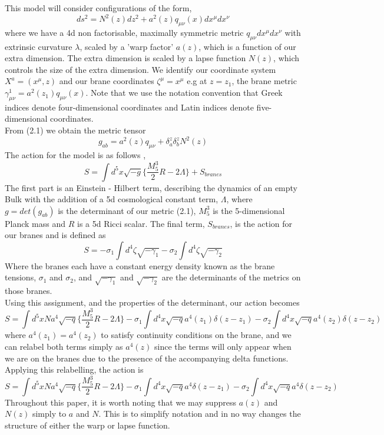 \documentclass[11pt]{report}
\numberwithin{equation}{chapter}
\begin{document}
This model will consider configurations of the form,
\begin{equation}
    ds^2= N^2(z)dz^{2} + a^{2}(z) q _{\mu\nu}(x) dx^{\mu} dx^{\nu}
\end{equation}
where we have a 4d non factorisable, maximally symmetric metric $q_{\mu\nu}dx^\mu dx^\nu$ with extrinsic curvature $\lambda$, scaled by a 'warp factor' $a(z)$, which is a function of our extra dimension. The extra dimension is scaled by a lapse function $N(z)$, which controls the size of the extra dimension. We identify our coordinate system $X^a = (x^\mu , z)$ and our brane coordinates $\zeta^\mu = x^\mu$ e.g at $z=z_1$, the brane metric $\gamma^{1}_{\mu\nu}=a^{2}(z_1) q _{\mu\nu}(x)$. Note that we use the notation convention that Greek indices denote four-dimensional coordinates and Latin indices denote five-dimensional coordinates.\\
From (2.1) we obtain the metric tensor
\begin{equation}
    g_{a b}=a^2(z) q_{\mu\nu}+\delta_a^z \delta_b^z N^2(z)
\end{equation}
The action for the model is as follows \cite{RS1},
\begin{equation}
    S= \int d^{5}x  \sqrt{-g} \bigg\{ \frac{M^{3}_{5}}{2} R -2\Lambda \bigg\}  +S_{branes}
\end{equation}
The first part is an Einstein - Hilbert term, describing the dynamics of an empty Bulk with the addition of a 5d cosmological constant term, $\Lambda$, where $g=det(g_{ab})$ is the determinant of our metric (2.1), $M^{3}_{5}$ is the 5-dimensional Planck mass and $R$ is a 5d Ricci scalar. The final term, $S_{branes}$, is the action for our branes and is defined as
\begin{equation}
    S= -\sigma_1\int d^{4}\zeta   \sqrt{-\gamma_1} - \sigma_2\int d^{4}\zeta   \sqrt{-\gamma_2}
\end{equation}
Where the branes each have a constant energy density known as the brane tensions, $\sigma_1$ and $\sigma_2$, and $\sqrt{-\gamma_1}$ and $\sqrt{-\gamma_2}$ are the determinants of the metrics on those branes.\\

Using this assignment, and the properties of the determinant, our action becomes
\begin{equation}
    S= \int d^{5}x Na^{4} \sqrt{-q} \bigg\{ \frac{M^{3}_{5}}{2} R -2\Lambda \bigg\} - \sigma_1\int d^4x\sqrt{-q}a^4(z_1)\delta(z-z_1) - \sigma_2\int d^4x\sqrt{-q}a^4(z_2)\delta(z-z_2)
\end{equation}
where $a^4(z_1) = a^4(z_2)$ to satisfy continuity conditions on the brane, and we can relabel both terms simply as $a^4(z)$ since the terms will only appear when we are on the branes due to the presence of the accompanying delta functions. Applying this relabelling, the action is
\begin{equation}
    S= \int d^{5}x Na^{4} \sqrt{-q} \bigg\{ \frac{M^{3}_{5}}{2} R -2\Lambda \bigg\} - \sigma_1\int d^4x\sqrt{-q}a^4\delta(z-z_1) - \sigma_2\int d^4x\sqrt{-q}a^4\delta(z-z_2)
\end{equation}
Throughout this paper, it is worth noting that we may suppress $a(z)$ and $N(z)$ simply to $a$ and $N$. This is to simplify notation and in no way changes the structure of either the warp or lapse function.
\end{document}
